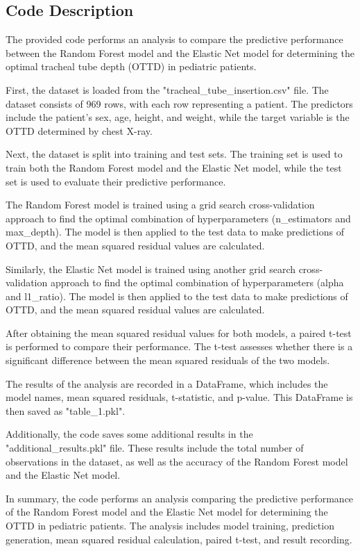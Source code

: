 \documentclass[11pt]{article}
\begin{document}
\subsection{Code Description}

The provided code performs an analysis to compare the predictive performance between the Random Forest model and the Elastic Net model for determining the optimal tracheal tube depth (OTTD) in pediatric patients.

First, the dataset is loaded from the "tracheal\_tube\_insertion.csv" file. The dataset consists of 969 rows, with each row representing a patient. The predictors include the patient's sex, age, height, and weight, while the target variable is the OTTD determined by chest X-ray.

Next, the dataset is split into training and test sets. The training set is used to train both the Random Forest model and the Elastic Net model, while the test set is used to evaluate their predictive performance.

The Random Forest model is trained using a grid search cross-validation approach to find the optimal combination of hyperparameters (n\_estimators and max\_depth). The model is then applied to the test data to make predictions of OTTD, and the mean squared residual values are calculated.

Similarly, the Elastic Net model is trained using another grid search cross-validation approach to find the optimal combination of hyperparameters (alpha and l1\_ratio). The model is then applied to the test data to make predictions of OTTD, and the mean squared residual values are calculated.

After obtaining the mean squared residual values for both models, a paired t-test is performed to compare their performance. The t-test assesses whether there is a significant difference between the mean squared residuals of the two models.

The results of the analysis are recorded in a DataFrame, which includes the model names, mean squared residuals, t-statistic, and p-value. This DataFrame is then saved as "table\_1.pkl".

Additionally, the code saves some additional results in the "additional\_results.pkl" file. These results include the total number of observations in the dataset, as well as the accuracy of the Random Forest model and the Elastic Net model.

In summary, the code performs an analysis comparing the predictive performance of the Random Forest model and the Elastic Net model for determining the OTTD in pediatric patients. The analysis includes model training, prediction generation, mean squared residual calculation, paired t-test, and result recording.
\end{document}

